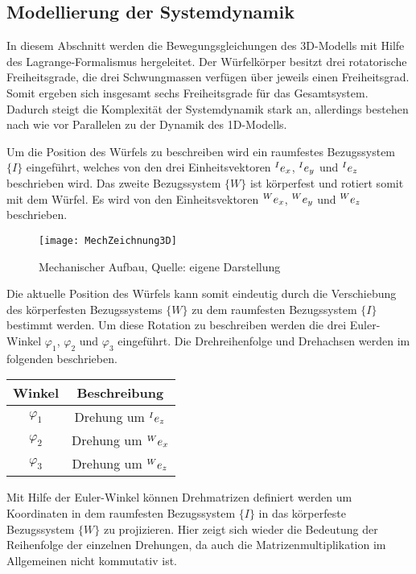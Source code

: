 \subsection{Modellierung der Systemdynamik}
In diesem Abschnitt werden die Bewegungsgleichungen des 3D-Modells mit Hilfe des Lagrange-Formalismus hergeleitet. Der Würfelkörper besitzt drei rotatorische Freiheitsgrade, die drei Schwungmassen verfügen über jeweils einen Freiheitsgrad. Somit ergeben sich insgesamt sechs Freiheitsgrade für das Gesamtsystem. Dadurch steigt die Komplexität der Systemdynamik stark an, allerdings bestehen nach wie vor Parallelen zu der Dynamik des 1D-Modells.
\newline

Um die Position des Würfels zu beschreiben wird ein raumfestes Bezugssystem $\{I\}$ eingeführt, welches von den drei Einheitsvektoren $\prescript{I}{} e_x$, $\prescript{I}{} e_y$ und $\prescript{I}{} e_z$ beschrieben wird. Das zweite Bezugssystem $\{W\}$ ist körperfest und rotiert somit mit dem Würfel. Es wird von den Einheitsvektoren $\prescript{W}{} e_x$, $\prescript{W}{} e_y$ und $\prescript{W}{} e_z$ beschrieben.

\begin{figure}[h]
\centering
\texttt{[image: MechZeichnung3D]}
\caption{Mechanischer Aufbau, Quelle: eigene Darstellung}
\end{figure}

Die aktuelle Position des Würfels kann somit eindeutig durch die Verschiebung des körperfesten Bezugssystems $\{W\}$ zu dem raumfesten Bezugssystem $\{I\}$ bestimmt werden. Um diese Rotation zu beschreiben werden die drei Euler-Winkel $\varphi_1$, $\varphi_2$ und $\varphi_3$ eingeführt. Die Drehreihenfolge und Drehachsen werden im folgenden beschrieben.

\begin{table}[h]
\centering
\begin{tabular}{|c|c|}
\hline
\textbf{Winkel} & \textbf{Beschreibung} \\ \hline
$\varphi_1$ & Drehung um $\prescript{I}{} e_z$ \\ \hline
$\varphi_2$ & Drehung um $\prescript{W}{} e_x$  \\ \hline
$\varphi_3$ & Drehung um $\prescript{W}{} e_z$ \\ \hline
\end{tabular}
\end{table}

Mit Hilfe der Euler-Winkel können Drehmatrizen definiert werden um Koordinaten in dem raumfesten Bezugssystem $\{I\}$ in das körperfeste Bezugssystem $\{W\}$ zu projizieren. Hier zeigt sich wieder die Bedeutung der Reihenfolge der einzelnen Drehungen, da auch die Matrizenmultiplikation im Allgemeinen nicht kommutativ ist.

